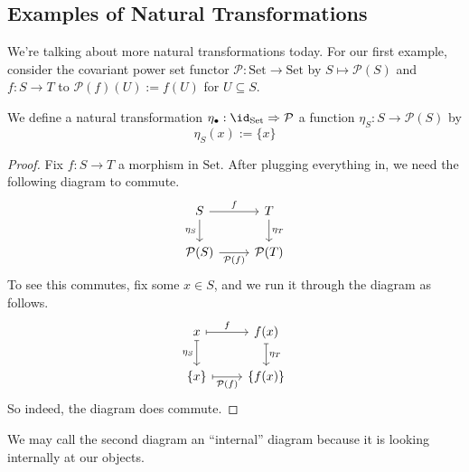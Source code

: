 \documentclass[../notes.tex]{subfiles}
\begin{document}

\subsection{Examples of Natural Transformations}
We're talking about more natural transformations today. For our first example, consider the covariant power set functor $\mathcal P:\mathrm{Set}\to\mathrm{Set}$ by $S\mapsto\mathcal P(S)$ and $f:S\to T$ to $\mathcal P(f)(U):=f(U)$ for $U\subseteq S$.
\begin{exe}
	 We define a natural transformation $\eta_\bullet:\id_{\mathrm{Set}}\Rightarrow\mathcal P$ a function $\eta_S:S\to\mathcal P(S)$ by
	\[\eta_S(x):=\{x\}\]
\end{exe}
\begin{proof}
	Fix $f:S\to T$ a morphism in $\mathrm{Set}$. After plugging everything in, we need the following diagram to commute.
	\[\begin{tikzcd}
		S & T \\
		{\mathcal P(S)} & {\mathcal P(T)}
		\arrow["{\mathcal P(f)}"', from=2-1, to=2-2]
		\arrow["{\eta_S}"', from=1-1, to=2-1]
		\arrow["{\eta_T}", from=1-2, to=2-2]
		\arrow["f", from=1-1, to=1-2]
	\end{tikzcd}\]
	To see this commutes, fix some $x\in S$, and we run it through the diagram as follows.
	\[\begin{tikzcd}
		x & {f(x)} \\
		{\{x\}} & {\{f(x)\}}
		\arrow["{\eta_S}"', maps to, from=1-1, to=2-1]
		\arrow["{\eta_T}", maps to, from=1-2, to=2-2]
		\arrow["f", maps to, from=1-1, to=1-2]
		\arrow["{\mathcal P(f)}"', maps to, from=2-1, to=2-2]
	\end{tikzcd}\]
	So indeed, the diagram does commute.
\end{proof}
\begin{remark}
	We may call the second diagram an ``internal'' diagram because it is looking internally at our objects.
\end{remark}
\end{document}
